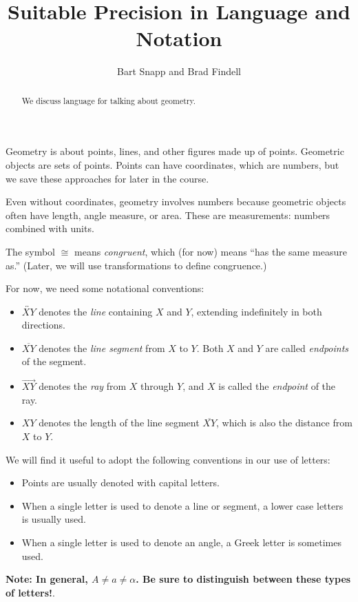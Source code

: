 \documentclass[handout]{ximera}
\title{Suitable Precision in Language and Notation}
\author{Bart Snapp and Brad Findell}
\begin{document}
\begin{abstract}
  We discuss language for talking about geometry.
\end{abstract}
\maketitle

Geometry is about points, lines, and other figures made up of points.  Geometric objects are sets of points.  Points can have coordinates, which are numbers, but we save these approaches for later in the course.  

Even without coordinates, geometry involves numbers because geometric objects often have length, angle measure, or area.  These are measurements:  numbers combined with units.  

The symbol $\cong$ means \emph{congruent}, which (for now) means ``has the same measure as.''  (Later, we will use transformations to define congruence.)

For now, we need some notational conventions: 

\begin{itemize}
\item $\overleftrightarrow{XY}$ denotes the \emph{line} containing $X$ and $Y$, extending indefinitely in both directions. 
\item $\overline{XY}$ denotes the \emph{line segment} from $X$ to $Y$.  Both $X$ and $Y$ are called \emph{endpoints} of the segment. 
\item $\overrightarrow{XY}$ denotes the \emph{ray} from $X$ through $Y$, and $X$ is called the \emph{endpoint} of the ray. 
\item $XY$ denotes the length of the line segment $\overline{XY}$, which is also the distance from $X$ to $Y$.  
\end{itemize}

We will find it useful to adopt the following conventions in our use of letters: 
\begin{itemize}
\item Points are usually denoted with capital letters.  
\item When a single letter is used to denote a line or segment, a lower case letters is usually used.  
\item When a single letter is used to denote an angle, a Greek letter is sometimes used.   
\end{itemize}

\textbf{Note: In general, $A\ne a \ne \alpha$. Be sure to distinguish between these types of letters!}.  
\end{document}
